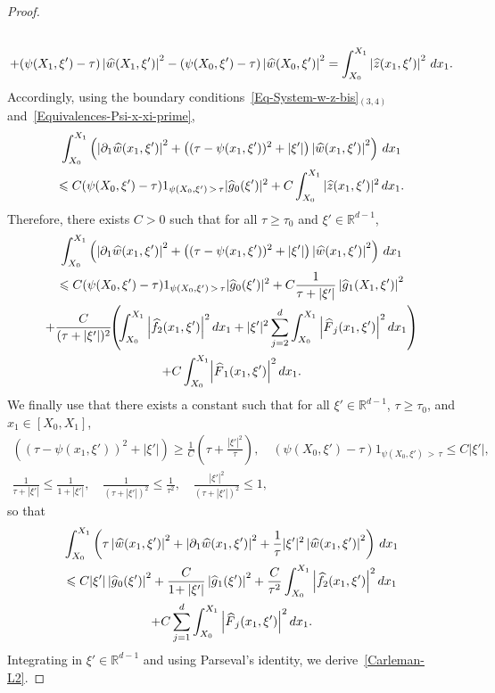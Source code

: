 \documentclass[AHL,Unicode,longabstracts]{cedram}
\newcommand*\R{\mathbb{R}}
\renewcommand{\leq}{\leqslant}
\renewcommand{\geq}{\geqslant}
\renewcommand{\hat}{\widehat}
\let\oldhat\hat
\renewcommand*{\hat}[1]{\mathchoice{\widehat{#1}}{\widehat{#1}}{\oldhat{#1}}{\oldhat{#1}}}
\begin{document}
\begin{proof}
\begin{multline*}
\\
+ (\psi(X_1, \xi') - \tau) \left|\hat w(X_1, \xi')\right|^2 - (\psi(X_0, \xi') - \tau) \left|\hat w(X_0, \xi')\right|^2 =
\int_{X_0}^{X_1}\left| \hat z(x_1, \xi')\right|^2 \, dx_1.
\end{multline*}
Accordingly, using the boundary conditions~\eqref{Eq-System-w-z-bis}$_{(3,4)}$ and~\eqref{Equivalences-Psi-x-xi-prime},
\begin{multline*}
\int_{X_0}^{X_1}\left(\left|\partial_1 \hat w(x_1, \xi')\right|^2 + \left((\tau - \psi(x_1, \xi'))^2 + |\xi'| \right) \left|\hat w(x_1, \xi')\right|^2\right) \, dx_1
\\
\leq C (\psi(X_0, \xi') - \tau) 1_{\psi(X_0, \xi')\,>\,\tau} |\hat g_0(\xi')|^2 + C \int_{X_0}^{X_1}| \hat z(x_1, \xi')|^2 \, dx_1.
\end{multline*}
Therefore, there exists $C>0$ such that for all $\tau \geq \tau_0$ and $\xi' \in \R^{d-1}$,
\begin{multline*}
\int_{X_0}^{X_1}\left(\left|\partial_1 \hat w(x_1, \xi')\right|^2 + \left((\tau - \psi(x_1, \xi'))^2 + |\xi'| \right) \left|\hat w(x_1, \xi')\right|^2\right) \, dx_1
\\
\leq C (\psi(X_0, \xi') - \tau) 1_{\psi(X_0, \xi')\,>\,\tau} |\hat g_0(\xi')|^2 + C \frac{1}{\tau + |\xi'| } \left|\hat g_1(X_1, \xi')\right|^2
\\
+ \frac{C}{(\tau + |\xi'|)^2}\!\! \left(\!\int_{X_0}^{X_1}\left| \widehat f_2(x_1, \xi') \right|^2 dx_1
+ |\xi'|^2\sum_{j=2}^d \int_{X_0}^{X_1} 
\left| \hat F_j(x_1, \xi')\right|^2 dx_1\right)\\ + C  \int_{X_0}^{X_1} \!\left|\hat F_1(x_1, \xi')\right|^2 dx_1.
\end{multline*}
We finally use that there exists a constant such that for all $\xi' \in \R^{d-1}$, $\tau \geq \tau_0$, and $x_1 \in [X_0, X_1]$,
\begin{multline*}
 \left((\tau - \psi(x_1, \xi'))^2 + |\xi'| \right) \geq \frac{1}{C} \left(\tau + \frac{|\xi'|^2}{\tau} \right),
\quad (\psi(X_0, \xi') - \tau) 1_{\psi(X_0, \xi')\,>\,\tau}
\leq C |\xi'|,\\
\frac{1}{\tau + |\xi'| } \leq \frac{1}{1+|\xi'|},
\quad
\frac{1}{(\tau + |\xi'|)^2 } \leq \frac{1}{\tau^2},
\quad
\frac{|\xi'|^2 }{(\tau + |\xi'|)^2 } \leq 1,
\end{multline*}
so that
\begin{multline*}
\int_{X_0}^{X_1}\left(\tau \left|\hat w(x_1, \xi')\right|^2 + \left|\partial_1 \hat w(x_1, \xi')\right|^2 + \frac{1}{\tau} |\xi'|^2 \left|\hat w(x_1, \xi')\right|^2\right) \, dx_1
\\
\leq C |\xi'|  \left|\hat g_0(\xi')\right|^2 +
\frac{C}{1\! + |\xi'| } \left|\hat g_1(\xi')\right|^2 + \frac{C}{\tau^2}\int_{X_0}^{X_1} \left| \widehat f_2(x_1, \xi')\right|^2 dx_1 \\
+ C \sum_{j=1}^d \int_{X_0}^{X_1} \left| \hat F_j(x_1, \xi')\right|^2 dx_1.
\end{multline*}
Integrating in $\xi' \in \R^{d-1}$ and using Parseval's identity, we derive~\eqref{Carleman-L2}.


\end{proof}
\end{document}
